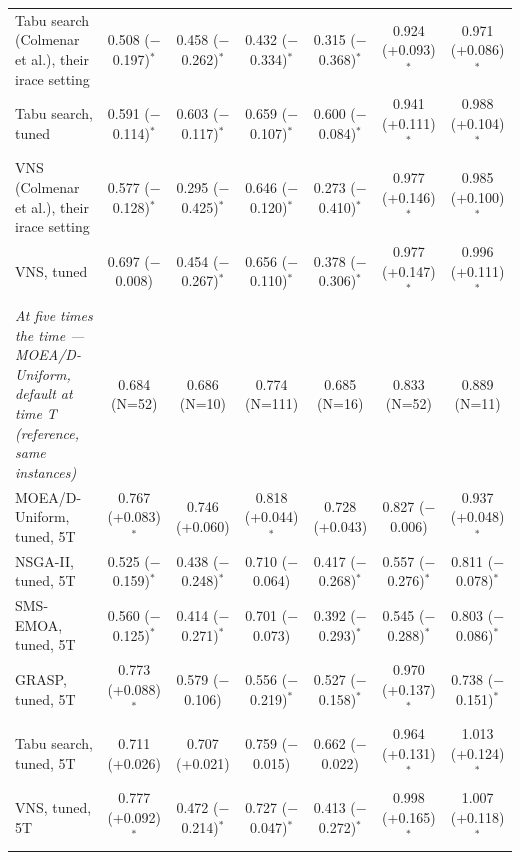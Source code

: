 \begin{table}[t]
{\begin{tabular}{lcccccc}
Tabu search (Colmenar et al.), their irace setting & 0.508 ($-$0.197)$^{*}$ & 0.458 ($-$0.262)$^{*}$ & 0.432 ($-$0.334)$^{*}$ & 0.315 ($-$0.368)$^{*}$ & 0.924 (+0.093)$^{*}$ & 0.971 (+0.086)$^{*}$ \\
Tabu search, tuned & 0.591 ($-$0.114)$^{*}$ & 0.603 ($-$0.117)$^{*}$ & 0.659 ($-$0.107)$^{*}$ & 0.600 ($-$0.084)$^{*}$ & 0.941 (+0.111)$^{*}$ & 0.988 (+0.104)$^{*}$ \\
VNS (Colmenar et al.), their irace setting & 0.577 ($-$0.128)$^{*}$ & 0.295 ($-$0.425)$^{*}$ & 0.646 ($-$0.120)$^{*}$ & 0.273 ($-$0.410)$^{*}$ & 0.977 (+0.146)$^{*}$ & 0.985 (+0.100)$^{*}$ \\
VNS, tuned & 0.697 ($-$0.008) & 0.454 ($-$0.267)$^{*}$ & 0.656 ($-$0.110)$^{*}$ & 0.378 ($-$0.306)$^{*}$ & 0.977 (+0.147)$^{*}$ & 0.996 (+0.111)$^{*}$ \\
\emph{At five times the time --- MOEA/D-Uniform, default at time T (reference, same instances)} & 0.684 (N=52) & 0.686 (N=10) & 0.774 (N=111) & 0.685 (N=16) & 0.833 (N=52) & 0.889 (N=11) \\
MOEA/D-Uniform, tuned, 5T & 0.767 (+0.083)$^{*}$ & 0.746 (+0.060) & 0.818 (+0.044)$^{*}$ & 0.728 (+0.043) & 0.827 ($-$0.006) & 0.937 (+0.048)$^{*}$ \\
NSGA-II, tuned, 5T & 0.525 ($-$0.159)$^{*}$ & 0.438 ($-$0.248)$^{*}$ & 0.710 ($-$0.064) & 0.417 ($-$0.268)$^{*}$ & 0.557 ($-$0.276)$^{*}$ & 0.811 ($-$0.078)$^{*}$ \\
SMS-EMOA, tuned, 5T & 0.560 ($-$0.125)$^{*}$ & 0.414 ($-$0.271)$^{*}$ & 0.701 ($-$0.073) & 0.392 ($-$0.293)$^{*}$ & 0.545 ($-$0.288)$^{*}$ & 0.803 ($-$0.086)$^{*}$ \\
GRASP, tuned, 5T & 0.773 (+0.088)$^{*}$ & 0.579 ($-$0.106) & 0.556 ($-$0.219)$^{*}$ & 0.527 ($-$0.158)$^{*}$ & 0.970 (+0.137)$^{*}$ & 0.738 ($-$0.151)$^{*}$ \\
Tabu search, tuned, 5T & 0.711 (+0.026) & 0.707 (+0.021) & 0.759 ($-$0.015) & 0.662 ($-$0.022) & 0.964 (+0.131)$^{*}$ & 1.013 (+0.124)$^{*}$ \\
VNS, tuned, 5T & 0.777 (+0.092)$^{*}$ & 0.472 ($-$0.214)$^{*}$ & 0.727 ($-$0.047)$^{*}$ & 0.413 ($-$0.272)$^{*}$ & 0.998 (+0.165)$^{*}$ & 1.007 (+0.118)$^{*}$ \\
\bottomrule
\end{tabular}
}
\end{table}

